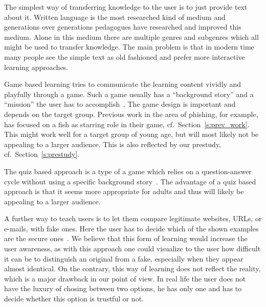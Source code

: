 \begin{description}[leftmargin=0cm]
    \item[Simple Text] The simplest way of transferring knowledge to the user is to just provide text about it.
    Written language is the most researched kind of medium and generations over generations pedagogues have researched and improved this medium.
    Alone in this medium there are multiple genres and subgenres which all might be used to transfer knowledge.
    The main problem is that in modern time many people see the simple text as old fashioned and prefer more interactive learning approaches. 
    
	\item[Game Based Learning] Game based learning tries to communicate the learning content vividly and playfully through a game.
 Such a game usually has a ``background story'' and a ``mission'' the user has to accomplish~\cite{sheng2007antiphishingphil,antiphishingphyllis}. The game design is important and depends on the target group.
 Previous work in the area of phishing, for example, has focused on a fish as starring role in their game, cf.~Section~\ref{s:prev_work}. This might work well for a target group of young age, but will most likely not be appealing to a larger audience.
 This is also reflected by our prestudy, cf.~Section~\ref{s:prestudy}.
	\item[Quiz Based Learning] The quiz based approach is a type of a game which relies on a question-answer cycle without using a specific background story~\cite{onguardonline}. The advantage of a quiz based approach is that it seems more appropriate for adults and thus will likely be appealing to a larger audience.

	\item[Comparison Based Learning] A further way to teach users is to let them compare legitimate websites, URLs, or e-mails, with fake ones.
 Here the user has to decide which of the shown examples are the secure ones~\cite{staysafeonline}. 
We believe that this form of learning would increase the user awareness, as with this approach one could visualize to the user how difficult it can be to distinguish an original from a fake, especially when they appear almost identical.
 On the contrary, this way of learning does not reflect the reality, which is a major drawback in our point of view.
 In real life the user does not have the luxury of chosing between two options, he has only one and has to decide whether this option is trustful or not.


\end{description}
